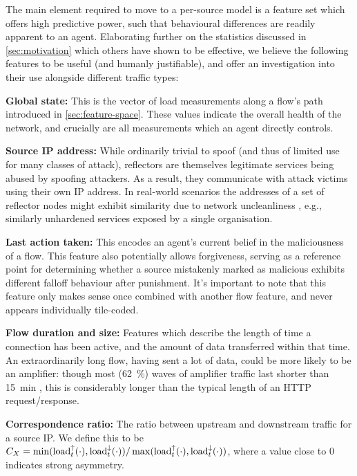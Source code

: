 \documentclass[10pt, times, comsoc]{IEEEtran}
\newcommand{\fakepara}[1]{\noindent\textbf{#1:}}
\begin{document}
The main element required to move to a per-source model is a feature set which offers high predictive power, such that behavioural differences are readily apparent to an agent.
Elaborating further on the statistics discussed in \cref{sec:motivation} which others have shown to be effective, we believe the following features to be useful (and humanly justifiable), and offer an investigation into their use alongside different traffic types:

\fakepara{Global state}
This is the vector of load measurements along a flow's path introduced in \cref{sec:feature-space}.
These values indicate the overall health of the network, and crucially are all measurements which an agent directly controls.

\fakepara{Source IP address}
While ordinarily trivial to spoof (and thus of limited use for many classes of attack), reflectors are themselves legitimate services being abused by spoofing attackers.
As a result, they communicate with attack victims using their own IP address.
In real-world scenarios the addresses of a set of reflector nodes might exhibit similarity due to network uncleanliness \cite{DBLP:conf/imc/CollinsSFJWSK07}, e.g., similarly unhardened services exposed by a single organisation.

\fakepara{Last action taken}
This encodes an agent's current belief in the maliciousness of a flow.
This feature also potentially allows forgiveness, serving as a reference point for determining whether a source mistakenly marked as malicious exhibits different falloff behaviour after punishment.
It's important to note that this feature only makes sense once combined with another flow feature, and never appears individually tile-coded.

\fakepara{Flow duration and size}
Features which describe the length of time a connection has been active, and the amount of data transferred within that time.
An extraordinarily long flow, having sent a lot of data, could be more likely to be an amplifier: though most (\SI{62}{\percent}) waves of amplifier traffic last shorter than \SI{15}{\minute} \cite{DBLP:conf/raid/KramerKMNKYR15}, this is considerably longer than the typical length of an HTTP request/response.

\fakepara{Correspondence ratio}
The ratio between upstream and downstream traffic for a source IP.
We define this to be $C_X = \min(\operatorname{load}^{\uparrow}_{t}(\cdot), \operatorname{load}^{\downarrow}_{t}(\cdot))/\max(\operatorname{load}^{\uparrow}_{t}(\cdot), \operatorname{load}^{\downarrow}_{t}(\cdot))$, where a value close to 0 indicates strong asymmetry.
\end{document}
